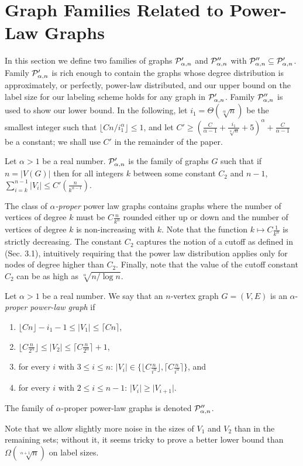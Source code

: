 
 \section{Graph Families Related to Power-Law Graphs}\label{Sec:GraphFamilies}
In this section we define two families of graphs $ \mathcal{P}'_{\alpha,n}$ and $ \mathcal{P}''_{\alpha,n}$ with $ \mathcal{P}''_{\alpha,n}\subseteq \mathcal{P}'_{\alpha,n}$. Family $ \mathcal{P}'_{\alpha,n}$ is rich enough to contain the graphs whose degree distribution is approximately, or perfectly, power-law distributed, and our upper bound on the label size for our labeling scheme holds for any graph in $ \mathcal{P}'_{\alpha,n}$. Family $ \mathcal{P}''_{\alpha,n}$ is used to show our lower bound. In the following, let $i_1 = \Theta(\sqrt[\alpha]n)$ be the smallest integer such that $\lfloor Cn/i_1^\alpha\rfloor \leq 1$, and let $C'\geq(\frac C{\alpha-1} + \frac{i_1}{\sqrt[\alpha] n} + 5)^{\alpha} + \frac{C}{\alpha - 1}$ be a constant; we shall use $C'$ in the remainder of the paper.
\begin{definition} \label{def:general-family}
Let $\alpha > 1$ be a real number. $ \mathcal{P}'_{\alpha,n}$ is the family of graphs $G$ such that if $n = \vert V(G)\vert$ then for all integers $k$ between  some constant $C_2$ and $n-1$, $\sum_{i = k}^{n-1} {\vert V_i\vert} \leq C'(\frac{n}{k^{\alpha-1}})$.
\end{definition}

The class of $\alpha$\emph{-proper} power law graphs contains graphs where  the number of vertices of degree $k$
must be $C \frac{n}{k^{\alpha}}$ rounded either up or down and the number of vertices of degree $k$ is non-increasing
with $k$. Note that the function $k \mapsto  C \frac{1}{k^{\alpha}}$ is strictly decreasing.
The constant $C_2$ captures the notion of a cutoff as defined in~\cite{clauset2009power} (Sec. 3.1), intuitively requiring that the power law distribution applies only for nodes of degree higher than $C_2$.
Finally, note that the value of  the cutoff constant $C_2$ can be as high as  $\sqrt[\alpha]{n/\log n}$.

 
\begin{definition}\label{def:proper}
Let $\alpha > 1$ be a real number. We say that an $n$-vertex graph  $G=(V,E)$ is an  $\alpha$-\emph{proper power-law graph} 
if
\begin{enumerate}
\item $\lfloor Cn\rfloor - i_1 - 1\leq\vert V_1\vert\leq\lceil Cn\rceil$,
\item $\lfloor C\frac n{2^\alpha}\rfloor\leq\vert V_2\vert\leq\lceil C\frac n{2^\alpha}\rceil + 1$,
\item for every $i$ with $3 \leq i \leq n$:  $\vert V_i \vert\in \{\lfloor C\frac{n}{i^{\alpha}} \rfloor, \lceil C \frac{n}{i^{\alpha}} \rceil\}$, and
\item for every $i$ with $2 \leq i \leq n-1$: $\vert V_i \vert \geq \vert V_{i+1} \vert$.
\end{enumerate}
The family of $\alpha$-proper power-law graphs is denoted $ \mathcal{P}''_{\alpha,n}$.
\end{definition}
Note that we allow slightly more noise in the sizes of $V_1$ and $V_2$ than in the remaining sets; without it, it seems tricky to prove a better lower bound than $\Omega(\sqrt[\alpha+1]{n})$ on label sizes.

